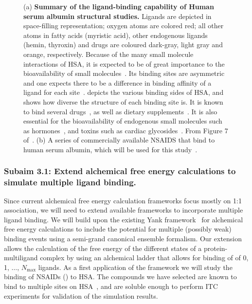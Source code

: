 \documentclass[10pt,final]{article}
\begin{document}
\begin{figure}[H]
\caption{(a) \textbf{Summary of the ligand-binding capability of Human serum albumin structural studies.} Ligands are depicted in space-filling representation; oxygen atoms are colored red; all other atoms in fatty acids (myristic acid), other endogenous ligands (hemin, thyroxin) and drugs are coloured dark-gray, light gray and orange, respectively. Because of the many small molecule interactions of HSA, it is expected to be of great importance to the bioavailability of small molecules~\autocite{Metcalfe2010a}. Its binding sites are asymmetric~\autocite{He1992a, Curry1998a} and one expects there to be a difference in binding affinity of a ligand for each site~\autocite{Sudlow1976a}.  depicts the various binding sides of HSA, and shows how diverse the structure of each binding site is. It is known to bind several drugs~\autocite{SJOeHOLM1979a,Bannwarth1996a,Sulkowska2002a,Ghuman2005a,Perez2007a,Zsila2011a}, as well as dietary supplements~\autocite{Pal2013a}. It is also essential for the bioavailability of endogenous small molecules such as hormones~\autocite{Pardridge1986a}, and toxins such as cardiac glycosides~\autocite{Smith1985a}. From Figure 7 of~\autocite{Ghuman2005a}. (b) A series of commercially available NSAIDS that bind to human serum albumin, which will be used for this study~\autocite{Zsila2011a}.}
\label{figure:hsa}
\end{figure} 

\subsubsection*{Subaim 3.1: Extend alchemical free energy calculations to simulate multiple ligand binding.}
Since current alchemical free energy calculation frameworks focus mostly on 1:1 association, we will need to extend available frameworks to incorporate multiple ligand binding. 
%
We will build upon the existing Yank framework~\autocite{Chodera2015a} for alchemical free energy calculations to include the potential for multiple (possibly weak) binding events using a semi-grand canonical ensemble formalism. 
%
Our extension allows the calculation of the free energy of the different states of a protein-multiligand complex by using an alchemical ladder that allows for binding of of 0, 1, $\dots$, $N_\mathrm{max}$ ligands.
%
As a first application of the framework we will study the binding of NSAIDs () to HSA.
%
The compounds we have selected are known to bind to multiple sites on HSA~\autocite{Zsila2011a}, and are soluble enough to perform ITC experiments for validation of the simulation results.
%
\end{document}
